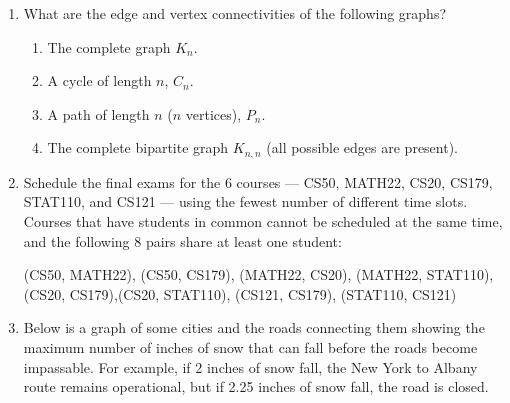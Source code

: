 \documentclass[12pt]{article}
\begin{document}
\begin{enumerate}

\item What are the edge and vertex connectivities of the following graphs? 
\begin{enumerate}
\item The complete graph $K_n$.
\item A cycle of length $n$, $C_n$.
\item A path of length $n$ ($n$ vertices), $P_n$.
\item The complete bipartite graph $K_{n,n}$ (all possible edges are present).
\end{enumerate}

\item Schedule the final exams for the 6 courses --- CS50, MATH22, CS20, CS179, STAT110, and CS121 --- using the fewest number of different time slots. Courses that have students in common cannot be scheduled at the same time, and the following 8 pairs share at least one student: 

(CS50, MATH22), (CS50, CS179), (MATH22, CS20), (MATH22, STAT110), (CS20, CS179),(CS20, STAT110), (CS121, CS179), (STAT110, CS121)
\pagebreak
\item 
Below is a graph of some cities and the roads connecting them showing the maximum number of inches of snow that can fall before the roads become impassable. For example, if 2 inches of snow fall, the New York to Albany route remains operational, but if 2.25 inches of snow fall, the road is closed.


\end{enumerate}
\end{document}
